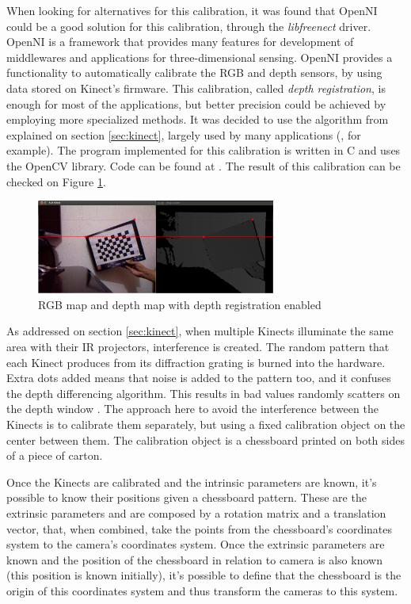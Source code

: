\documentclass[msc, a4paper, classic, en]{ufbathesis}
\begin{document}
When looking for alternatives for this calibration, it was found that OpenNI \cite{openni} could be a good solution for this calibration, through the \textit{libfreenect} driver. OpenNI is a framework that provides many features for development of middlewares and applications for three-dimensional sensing. OpenNI provides a functionality to automatically calibrate the RGB and depth sensors, by using data stored on Kinect's firmware. This calibration, called \textit{depth registration}, is enough for most of the applications, but better precision could be achieved by employing more specialized methods. It was decided to use the algorithm from \cite{burruscal} explained on section \ref{sec:kinect}, largely used by many applications (\cite{herrera}, for example). The program implemented for this calibration is written in C and uses the OpenCV \cite{opencv} library. Code can be found at \cite{masterproject}. The result of this calibration can be checked on Figure \ref{fig:kinectcal}.

\begin{figure}
\centering
\includegraphics[width=0.7\textwidth]{images/kinectcal.png}
\caption{RGB map and depth map with depth registration enabled}
\label{fig:kinectcal}
\end{figure}

As addressed on section \ref{sec:kinect}, when multiple Kinects illuminate the same area with their IR projectors, interference is created. The random pattern that each Kinect produces from its diffraction grating is burned into the hardware. Extra dots added means that noise is added to the pattern too, and it confuses the depth differencing algorithm. This results in bad values randomly scatters on the depth window \cite{kinecthacks}. The approach here to avoid the interference between the Kinects is to calibrate them separately, but using a fixed calibration object on the center between them. The calibration object is a chessboard printed on both sides of a piece of carton.

Once the Kinects are calibrated and the intrinsic parameters are known, it's possible to know their positions given a chessboard pattern. These are the extrinsic parameters and are composed by a rotation matrix and a translation vector, that, when combined, take the points from the chessboard's coordinates system to the camera's coordinates system. Once the extrinsic parameters are known and the position of the chessboard in relation to camera is also known (this position is known initially), it's possible to define that the chessboard is the origin of this coordinates system and thus transform the cameras to this system.
\end{document}
